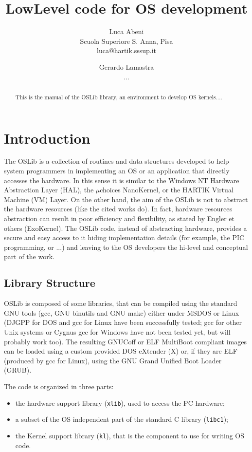 \documentclass[a4paper]{report}
\title{LowLevel code for OS development}
\author{Luca Abeni\\
	Scuola Superiore S. Anna, Pisa \\
	luca@hartik.sssup.it
\and
	Gerardo Lamastra\\
	...}
\date{}
\begin{document}
\setlength{\baselineskip}{1.5\baselineskip}
\maketitle
\begin{abstract}
This is the manual of the OSLib library, an environment to develop OS
kernels....
\end{abstract}

\chapter{Introduction}
The OSLib is a collection of routines and data structures developed to
help system programmers in implementing an OS or an application that
directly accesses the hardware. In this sense it is
similar to the Windows NT Hardware Abstraction Layer (HAL), the
$\mu$choices NanoKernel, or the HARTIK Virtual Machine (VM) Layer. On
the other hand, the aim of the OSLib is not to abstract the
hardware resources (like the cited works do).  In fact, hardware
resources abstraction can result in poor efficiency and flexibility,
as stated by Engler et others (ExoKernel). The OSLib code, instead of
abstracting hardware, provides a secure and easy access to it hiding
implementation details (for example, the PIC programming, or ...)
and leaving to the OS developers the hi-level and conceptual part of
the work.

\section{Library Structure}
OSLib is composed of some libraries, that can be compiled using
the standard GNU tools (gcc, GNU binutils and GNU make) either under
MSDOS or Linux (DJGPP for DOS and
gcc for Linux have been successfully tested; gcc for other Unix
systems or Cygnus gcc for Windows have not been tested yet, but
will probably work too). The resulting GNUCoff or ELF MultiBoot compliant
images can be loaded using a custom provided DOS eXtender (X) or,
if they are ELF (produced by gcc for Linux), using the GNU Grand
Unified Boot Loader (GRUB).

The code is organized in three parts: \begin{itemize}
\item the hardware support library ({\tt xlib}), used to access the PC
	hardware;
\item a subset of the OS independent part of the standard C library
	({\tt libc1});
\item the Kernel support library ({\tt kl}), that is the component to
	use for writing OS code.
\end{itemize}
\end{document}
